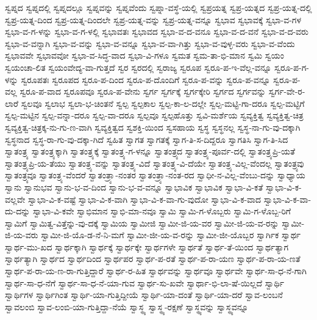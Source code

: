 {ಸ್ವಪ್ನದ
ಸ್ವಪ್ನದಲ್ಲಿ
ಸ್ವಪ್ನದಲ್ಲೂ
ಸ್ವಪ್ನವನ್ನು
ಸ್ವಪ್ನವೆಂದು
ಸ್ವಪ್ನಾ-ವಸ್ಥೆ-ಯಲ್ಲಿ
ಸ್ವಪ್ರಯತ್ನ
ಸ್ವಪ್ರ-ಯತ್ನದ
ಸ್ವಪ್ರ-ಯತ್ನ-ದಲ್ಲಿ
ಸ್ವಪ್ರ-ಯತ್ನ-ದಿಂದ
ಸ್ವಪ್ರ-ಯತ್ನ-ದಿಂದಲೇ
ಸ್ವಪ್ರ-ಯತ್ನ-ವನ್ನು
ಸ್ವಪ್ರ-ಯತ್ನ-ವನ್ನೂ
ಸ್ವಭಾವ
ಸ್ವಭಾವಕ್ಕೆ
ಸ್ವಭಾ-ವ-ಗಳ
ಸ್ವಭಾ-ವ-ಗ-ಳನ್ನು
ಸ್ವಭಾ-ವ-ಗ-ಳಲ್ಲಿ
ಸ್ವಭಾವತಃ
ಸ್ವಭಾವದ
ಸ್ವಭಾ-ವ-ದ-ವನೂ
ಸ್ವಭಾ-ವ-ದ-ವನೆ
ಸ್ವಭಾ-ವ-ದ-ವರು
ಸ್ವಭಾ-ವ-ವನ್ನಾಗಿ
ಸ್ವಭಾ-ವ-ವನ್ನು
ಸ್ವಭಾ-ವ-ವನ್ನೂ
ಸ್ವಭಾ-ವ-ವಾ-ಗಿತ್ತು
ಸ್ವಭಾ-ವ-ವುಳ್ಳ-ವರು
ಸ್ವಭಾ-ವ-ವೆಂದು
ಸ್ವಭಾವವೇ
ಸ್ವಭಾವವೋ
ಸ್ವಭಾ-ವ-ಸಿದ್ಧ-ವಾದ
ಸ್ವಭಾ-ವಿ-ಗಳೂ
ಸ್ವಮತ
ಸ್ವಮ-ತಾ-ಭಿ-ಮಾನ
ಸ್ವಮಿ
ಸ್ವಯಂ
ಸ್ವಯಂಚಾ-ಲಿತ
ಸ್ವಯಂವೇದ್ಯ-ವಾ-ಗುತ್ತದೆ
ಸ್ವರ
ಸ್ವರದಲ್ಲಿ
ಸ್ವರಾಜ್ಯ
ಸ್ವರೂಪ
ಸ್ವರೂ-ಪ-ಇ-ವೆಲ್ಲ-ವನ್ನೂ
ಸ್ವರೂ-ಪ-ಗ-ಳನ್ನು
ಸ್ವರೂಪತಃ
ಸ್ವರೂಪದ
ಸ್ವರೂ-ಪ-ದಿಂದ
ಸ್ವರೂ-ಪ-ದೊಂದಿಗೆ
ಸ್ವರೂ-ಪ-ವನ್ನು
ಸ್ವರೂ-ಪ-ವನ್ನೂ
ಸ್ವರೂ-ಪ-ವಲ್ಲ
ಸ್ವರೂ-ಪ-ವಾದ
ಸ್ವರೂಪವೂ
ಸ್ವರೂ-ಪ-ವೇನು
ಸ್ವರ್ಗ
ಸ್ವರ್ಗಕ್ಕೆ
ಸ್ವರ್ಗಕ್ಕೇರಿ
ಸ್ವರ್ಗದ
ಸ್ವರ್ಗವನ್ನು
ಸ್ವರ್ಗ-ವೇ-ರ-ಲಾರೆ
ಸ್ವಲವೂ
ಸ್ವಲಾಭ
ಸ್ವಲಾ-ಭ-ಚಿಂತನೆ
ಸ್ವಲ್ಪ
ಸ್ವಲ್ಪಕಾಲ
ಸ್ವಲ್ಪ-ಕಾ-ಲ-ದಲ್ಲೇ
ಸ್ವಲ್ಪ-ಮಟ್ಟಿ-ಗಾ-ದರೂ
ಸ್ವಲ್ಪ-ಮಟ್ಟಿಗೆ
ಸ್ವಲ್ಪ-ಮಟ್ಟಿನ
ಸ್ವಲ್ಪ-ವನ್ನಾ-ದರೂ
ಸ್ವಲ್ಪ-ವಾ-ದರೂ
ಸ್ವಲ್ಪವೂ
ಸ್ವಲ್ಪಹೊತ್ತು
ಸ್ವವಿ-ಮರ್ಶೆಯ
ಸ್ವವ್ಯಕ್ತಿತ್ವ
ಸ್ವವ್ಯಕ್ತಿತ್ವ-ಚಿತ್ರ
ಸ್ವವ್ಯಕ್ತಿತ್ವ-ಚಿತ್ರಕ್ಕ-ನು-ಗು-ಣ-ವಾಗಿ
ಸ್ವವ್ಯಕ್ತಿತ್ವದ
ಸ್ವಶಕ್ತಿ-ಯಿಂದ
ಸ್ವಸಹಾಯ
ಸ್ವಸ್ಥ
ಸ್ವಸ್ಥನಲ್ಲ
ಸ್ವಸ್ಥ-ನಾ-ಗು-ವು-ದಕ್ಕಾಗಿ
ಸ್ವಸ್ಥನಾದ
ಸ್ವಸ್ಥ-ರಾ-ಗು-ವು-ದಕ್ಕಾ-ಗಿದೆ
ಸ್ವಹಿತ
ಸ್ವಾಗತ
ಸ್ವಾಗತಕ್ಕೆ
ಸ್ವಾಗ-ತಿ-ಸ-ದಿದ್ದರೂ
ಸ್ವಾಗತಿಸಿ
ಸ್ವಾಗ-ತಿ-ಸಿದ
ಸ್ವಾತಂತ್ರ್ಯ
ಸ್ವಾತಂತ್ರ್ಯಕ್ಕಾಗಿ
ಸ್ವಾತಂತ್ರ್ಯಕ್ಕೆ
ಸ್ವಾತಂತ್ರ್ಯ-ಗ-ಳನ್ನೂ
ಸ್ವಾತಂತ್ರ್ಯದ
ಸ್ವಾತಂತ್ರ್ಯ-ಪೂರ್ವ-ದಲ್ಲಿ
ಸ್ವಾತಂತ್ರ್ಯಪ್ರಿ-ಯತೆ
ಸ್ವಾತಂತ್ರ್ಯಪ್ರಿ-ಯ-ತೆಯು
ಸ್ವಾತಂತ್ರ್ಯ-ವನ್ನು
ಸ್ವಾತಂತ್ರ್ಯ-ವಿದೆ
ಸ್ವಾತಂತ್ರ್ಯ-ವಿ-ದೆಯೇ
ಸ್ವಾತಂತ್ರ್ಯ-ವಿಲ್ಲ-ವೆಂದಲ್ಲ
ಸ್ವಾತಂತ್ರ್ಯವು
ಸ್ವಾತಂತ್ರ್ಯವೂ
ಸ್ವಾತಂತ್ರ್ಯ-ವೆಂದರೆ
ಸ್ವಾತಂತ್ರ್ಯಾ-ನಂತರ
ಸ್ವಾತಂತ್ರ್ಯಾ-ನಂತ-ರದ
ಸ್ವಾಧೀ-ನ-ವಿಲ್ಲ-ವೆಂಬು-ದನ್ನು
ಸ್ವಾಧ್ಯಾಯ
ಸ್ವಾನು
ಸ್ವಾನುಭವ
ಸ್ವಾನು-ಭ-ವ-ದಿಂದ
ಸ್ವಾನು-ಭ-ವ-ವನ್ನೂ
ಸ್ವಾಭಾವಿಕ
ಸ್ವಾಭಾವಿಕ
ಸ್ವಾಭಾ-ವಿ-ಕತೆ
ಸ್ವಾಭಾ-ವಿ-ಕ-ವಲ್ಲವೇ
ಸ್ವಾಭಾ-ವಿ-ಕ-ವಷ್ಟೆ
ಸ್ವಾಭಾ-ವಿ-ಕ-ವಾಗಿ
ಸ್ವಾಭಾ-ವಿ-ಕ-ವಾ-ಗು-ವುದೋ
ಸ್ವಾಭಾ-ವಿ-ಕ-ವಾದ
ಸ್ವಾಭಾ-ವಿ-ಕ-ವಾ-ದು-ದನ್ನು
ಸ್ವಾಭಾ-ವಿ-ಕವೇ
ಸ್ವಾಭಿಮಾನ
ಸ್ವಾಭಿ-ಮಾ-ನವೂ
ಸ್ವಾಮಿ
ಸ್ವಾಮಿ-ಗ-ಳೊಬ್ಬರು
ಸ್ವಾಮಿ-ಗ-ಳೊಬ್ಬ-ರಿಗೆ
ಸ್ವಾಮಿಗೆ
ಸ್ವಾಮಿತ್ವ-ವಿತ್ತೆನ್ನು-ವು-ದಕ್ಕೆ
ಸ್ವಾಮಿಯ
ಸ್ವಾಮೀಜಿ
ಸ್ವಾಮೀ-ಜಿ-ಯ-ವರ
ಸ್ವಾಮೀ-ಜಿ-ಯ-ವ-ರನ್ನು
ಸ್ವಾಮೀ-ಜಿ-ಯ-ವರು
ಸ್ವಾಮೀ-ಜಿ-ಯೊ-ಡ-ನೆ-ನಿ-ಮಗೆ
ಸ್ವಾಮೀ-ಜೀ-ಯ-ವ-ರನ್ನು
ಸ್ವಾಮೀ-ಜೀ-ಯೊಬ್ಬರ
ಸ್ವಾರ್ಗಿಕ
ಸ್ವಾರ್ಥ
ಸ್ವಾರ್ಥ-ಮು-ಖದ
ಸ್ವಾರ್ಥಕ್ಕಾಗಿ
ಸ್ವಾರ್ಥಕ್ಕೆ
ಸ್ವಾರ್ಥಕ್ಕೇ
ಸ್ವಾರ್ಥಗಳೇ
ಸ್ವಾರ್ಥತೆ
ಸ್ವಾರ್ಥ-ತೆ-ಯಿಂದ
ಸ್ವಾರ್ಥತ್ಯಾಗ
ಸ್ವಾರ್ಥತ್ಯಾಗಿ
ಸ್ವಾರ್ಥದ
ಸ್ವಾರ್ಥದಿಂದ
ಸ್ವಾರ್ಥಪರ
ಸ್ವಾರ್ಥ-ಪ-ರತೆ
ಸ್ವಾರ್ಥ-ಪ-ರಾ-ಯಣ
ಸ್ವಾರ್ಥ-ಪ-ರಾ-ಯ-ಣತೆ
ಸ್ವಾರ್ಥ-ಪ-ರಾ-ಯ-ಣ-ರಾ-ಗುತ್ತಿದ್ದಾರೆ
ಸ್ವಾರ್ಥ-ರ-ಹಿತ
ಸ್ವಾರ್ಥವನ್ನು
ಸ್ವಾರ್ಥವೂ
ಸ್ವಾರ್ಥವೇ
ಸ್ವಾರ್ಥ-ಸಾ-ಧ-ನೆ-ಗಾಗಿ
ಸ್ವಾರ್ಥ-ಸಾ-ಧ-ನೆಗೆ
ಸ್ವಾರ್ಥ-ಸಾ-ಧ-ನೆ-ಯಾ-ಗುವ
ಸ್ವಾರ್ಥ-ಸು-ಖವೇ
ಸ್ವಾರ್ಥಾ-ಭಿ-ಲಾ-ಷೆ-ಯಿಲ್ಲದೆ
ಸ್ವಾರ್ಥಿ
ಸ್ವಾರ್ಥಿಗಳ
ಸ್ವಾರ್ಥಿಗಿಂತ
ಸ್ವಾರ್ಥಿ-ಯಾ-ಗುತ್ತಿದ್ದೀಯೆ
ಸ್ವಾರ್ಥಿ-ಯಾ-ದಂತೆ
ಸ್ವಾರ್ಥಿ-ಯಾ-ದರೆ
ಸ್ವಾವ-ಲಂಬನೆ
ಸ್ವಾವಲಂಬಿ
ಸ್ವಾವ-ಲಂಬಿ-ಯಾ-ಗುತ್ತಿದ್ದಾ-ನೆಯೆ
ಸ್ವಾಸ್ಥ್ಯ
ಸ್ವಾಸ್ಥ್ಯ-ರಕ್ಷಣೆ
ಸ್ವಾಸ್ಥ್ಯವನ್ನು
ಸ್ವಾಸ್ಥ್ಯವನ್ನೂ
}

